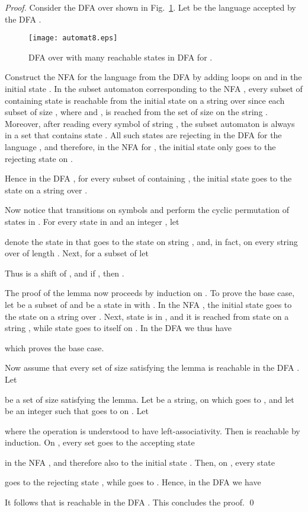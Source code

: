 \documentclass[runningheads]{llncs}
\begin{document}
\begin{proof}
 Consider the DFA  over 
 shown in  Fig.~\ref{fig:max_reach}.
 Let  be the language accepted by the DFA .
 
 \begin{figure}[t]\label{-----fig5}
 \centering
 \texttt{[image: automat8.eps]}
 \caption{DFA  over  with many reachable states in 
         DFA  for .}
 \label{fig:max_reach}
 \end{figure}

 Construct the NFA  for the language  from the DFA 
 by adding loops on  and  in the initial state .
 In the subset automaton corresponding to the NFA ,
 every subset of  containing state 
 is reachable from the initial state  on a string over 
 since each subset  of size ,
 where  and ,
 is reached from the set  of size 
 on the string .
 Moreover, after reading every symbol of string ,
 the subset automaton is always in a set that contains state .
 All such states are rejecting in the DFA  for the language ,
 and therefore, in the NFA  for ,
 the initial state  only goes to the rejecting state
  on .

 Hence in the DFA , for every subset   of 
 containing  ,
 the initial state  goes to the state 
 on a string  over .

 Now notice that transitions on symbols  and 
 perform the cyclic permutation of states  in .
 For every state  in  and an integer ,
 let 
 
 denote the state in 
 that goes to the state  on string ,
 and, in fact, on every string over  of length .
 Next, for a subset  of  let
 
 Thus  is a shift of ,
 and if , then .

 The proof of the lemma now proceeds by induction on .
 To prove the base case, let  be a subset of 
 and  be a state in  with .
 In the NFA , the initial state  goes to the state 
 on a string  over .
 Next, state  is  in ,
 and it is reached from state  on a string ,
 while state  goes to itself on .
 In the DFA  we thus have
 
 which proves the base case.

 Now assume that every set of size  satisfying the lemma
 is reachable in the DFA .
 Let 
 
 be a set of size  satisfying the lemma.
 Let  be a string, on which 
 goes to ,
 and let  be an integer such that   goes to  on .
 Let
 
 where the operation  is understood to have left-associativity.
 Then  is reachable by induction. 
 On ,
 every set 
 goes  to the accepting state 
 
 in the NFA , 
 and therefore also to the initial state .
 Then, on , every state 
  
 goes to the rejecting state 
 ,
 while  goes to .
 Hence, in the DFA  we have 
 
 It follows that  is reachable in the DFA .
 This  concludes the proof.
\qed
\end{proof}
\end{document}
